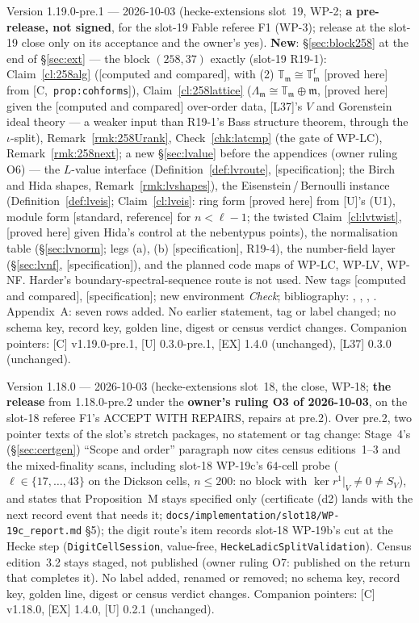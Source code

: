 \documentclass[11pt]{article}
\theoremstyle{remark}
\newcommand{\T}{\mathbb{T}}
\newcommand{\m}{\mathfrak{m}}
\newcommand{\HA}[1]{[C,~\texttt{#1}]}      %
\newcommand{\PROVED}{\textsf{[proved here]}}
\newcommand{\STD}{\textsf{[standard, reference]}}
\newcommand{\CMPD}{\textsf{[computed and compared]}}   %
\newcommand{\SPEC}{\textsf{[specification]}}           %
\begin{document}
Version 1.19.0-pre.1 --- 2026-10-03 (hecke-extensions slot~19, WP-2; \textbf{a pre-release, not signed}, for the slot-19 Fable referee F1 (WP-3);
release at the slot-19 close only on its acceptance and the owner's yes). \textbf{New}: \S\ref{sec:block258} at the end of \S\ref{sec:ext} --- the block
$(258,37)$ exactly (slot-19 R19-1): Claim~\ref{cl:258alg} (\CMPD, with (2) $\T_\m\cong\T^{\mathrm f}_\m$ \PROVED{} from \HA{prop:cohforms}), Claim~\ref{cl:258lattice}
($\Lambda_\m\cong\T_\m\oplus\m$, \PROVED{} given the \CMPD{} over-order data, [L37]'s $V$ and Gorenstein ideal theory --- a weaker input than R19-1's Bass structure theorem,
through the $\iota$-split), Remark~\ref{rmk:258Urank}, Check~\ref{chk:latcmp} (the gate of WP-LC), Remark~\ref{rmk:258next}; a new \S\ref{sec:lvalue} before the
appendices (owner ruling O6) --- the $L$-value interface (Definition~\ref{def:lvroute}, \SPEC; the Birch and Hida shapes, Remark~\ref{rmk:lvshapes}), the
Eisenstein\,/\,Bernoulli instance (Definition~\ref{def:lveis}; Claim~\ref{cl:lveis}: ring form \PROVED{} from [U]'s (U1), module form \STD{} for $n<\ell-1$; the twisted
Claim~\ref{cl:lvtwist}, \PROVED{} given Hida's control at the nebentypus points), the normalisation table (\S\ref{sec:lvnorm}; legs (a), (b) \SPEC, R19-4), the
number-field layer (\S\ref{sec:lvnf}, \SPEC), and the planned code maps of WP-LC, WP-LV, WP-NF. Harder's boundary-spectral-sequence route is not used. New tags
\CMPD, \SPEC; new environment \emph{Check}; bibliography: \cite{bass_ubiquity}, \cite{hida_cong}, \cite{hida_ens}, \cite{mtt}. Appendix~A: seven rows added. No earlier
statement, tag or label changed; no schema key, record key, golden line, digest or census verdict changes. Companion pointers: [C] v1.19.0-pre.1, [U]
0.3.0-pre.1, [EX] 1.4.0 (unchanged), [L37] 0.3.0 (unchanged).

Version 1.18.0 --- 2026-10-03 (hecke-extensions slot~18, the close, WP-18; \textbf{the release} from 1.18.0-pre.2 under the \textbf{owner's ruling O3
of 2026-10-03}, on the slot-18 referee F1's ACCEPT WITH REPAIRS, repairs at pre.2). Over pre.2, two pointer texts of the slot's stretch packages, no statement
or tag change: Stage~4's (\S\ref{sec:certgen}) ``Scope and order'' paragraph now cites census editions~1--3 and the mixed-finality scans, including slot-18 WP-19c's $64$-cell
probe ($\ell\in\{17,\dots,43\}$ on the Dickson cells, $n\le200$: no block with $\ker r^1|_V\ne0\ne S_V$), and states that Proposition~M stays specified only
(certificate (d2) lands with the next record event that needs it; \texttt{docs/implementation/slot18/WP-19c\_report.md} \S5); the digit route's item records
slot-18 WP-19b's cut at the Hecke step (\texttt{DigitCellSession}, value-free, \texttt{HeckeLadicSplitValidation}). Census edition~3.2 stays staged, not published
(owner ruling O7: published on the return that completes it). No label added, renamed or removed; no schema key, record key, golden line, digest or census
verdict changes. Companion pointers: [C] v1.18.0, [EX] 1.4.0, [U] 0.2.1 (unchanged).
\end{document}
